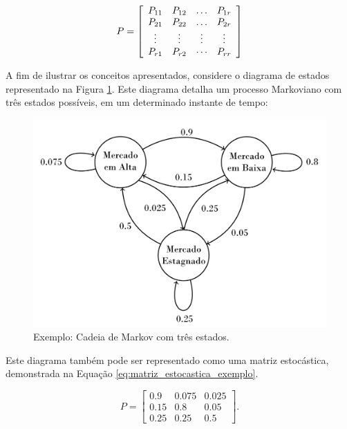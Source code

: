 \documentclass[msc, classic, a4paper]{ufbathesis}
\begin{document}
\begin{equation}
\label{eq:matriz_estocastica}
P = \left[ \begin{array} { c c c c } { P _ { 11 } } & { P _ { 12 } } & { \dots } & { P _ { 1 r } } \\ { P _ { 21 } } & { P _ { 22 } } & { \dots } & { P _ { 2 r } } \\ { \vdots } & { \vdots } & { \vdots } & { \vdots } \\ { P _ { r 1 } } & { P _ { r 2 } } & { \cdots } & { P _ { r r } } \end{array} \right]
\end{equation}

A fim de ilustrar os conceitos apresentados, considere o diagrama de estados representado na Figura \ref{fig:cadeia_markov_tres_estados}.
Este diagrama detalha um processo Markoviano com três estados possíveis, em um determinado instante de tempo:



\begin{figure}[H]
    \begin{center}
        \includegraphics[scale=0.35]{imagens/markov_chain_wikipedia.png}
        \caption{Exemplo: Cadeia de Markov com três estados.}
        \label{fig:cadeia_markov_tres_estados}
    \end{center}
\end{figure}

Este diagrama também pode ser representado como uma matriz estocástica, demonstrada na Equação \ref{eq:matriz_estocastica_exemplo}.

\begin{equation}
\label{eq:matriz_estocastica_exemplo}
P={\begin{bmatrix}0.9&0.075&0.025\\0.15&0.8&0.05\\0.25&0.25&0.5\end{bmatrix}}.
\end{equation}
\end{document}
